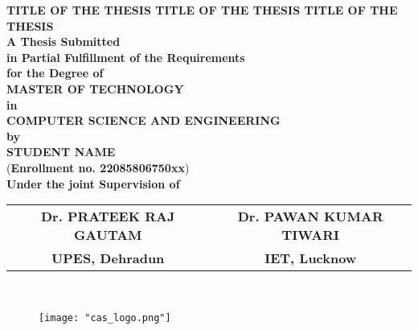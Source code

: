 \documentclass[a4paper, 12pt]{report}
\begin{document}
	\begin{titlepage}
		\setcounter{page}{1}
		\begin{center}
			{\MakeUppercase{\fontsize{20}{24}\selectfont \textbf{TITLE OF THE THESIS TITLE OF THE THESIS TITLE OF THE THESIS }}}\\[1cm] %
			
			{\fontsize{14}{17}\selectfont \textbf{A Thesis Submitted\\
					in Partial Fulfillment of the Requirements\\
					for the Degree of}}\\[1cm]
			
			{\MakeUppercase{\fontsize{20}{24}\selectfont \textbf{master of technology}}}\\[.5cm]
			
			{\fontsize{14}{17}\selectfont \textbf{in}}\\
			{\fontsize{16}{17}\selectfont \textbf{COMPUTER SCIENCE AND ENGINEERING}}\\    %
			{\fontsize{14}{17}\selectfont \textbf{by}}\\[0.5cm]
			{\MakeUppercase{\fontsize{16}{19}\selectfont \textbf{STUDENT NAME}}}\\ %
			
			{\fontsize{12}{14}\selectfont (\textbf{Enrollment no. 22085806750xx})}\\[1cm] %
			
			{\fontsize{12}{14}\selectfont \textbf{Under the joint Supervision of}}\\[0.2cm]
			
			\begin{tabular}{cc}
				{\fontsize{14}{17}\selectfont \textbf{Dr. PRATEEK RAJ GAUTAM }} & {\fontsize{14}{17}\selectfont \textbf{Dr. PAWAN KUMAR TIWARI}} \\
				{\fontsize{14}{17}\selectfont \textbf{UPES, Dehradun}} & {\fontsize{14}{17}\selectfont \textbf{IET, Lucknow}}
			\end{tabular}\
			\begin{figure}[h]
				\centering
				\texttt{[image: "cas\_logo.png"]}
				
			\end{figure}
			
			

\end{center}
\end{titlepage}
\end{document}
